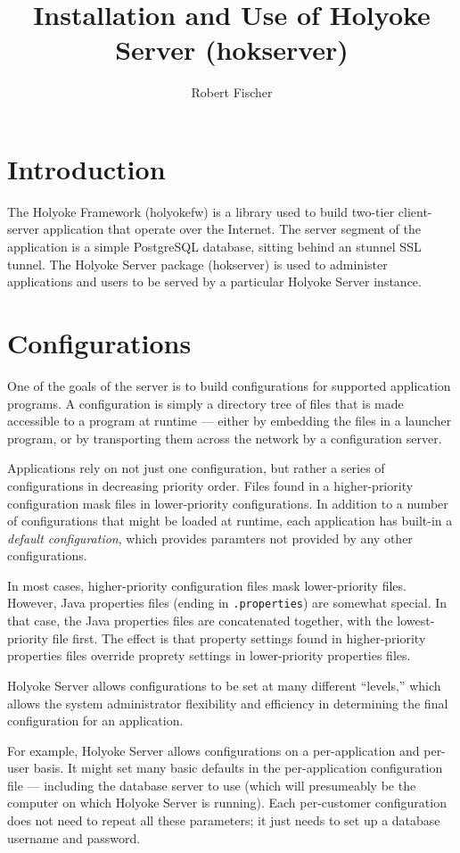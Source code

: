 \documentclass[11pt]{article}
\title{Installation and Use of Holyoke Server (hokserver)}
\author{Robert Fischer}
\begin{document}
\maketitle

\section{Introduction}

The Holyoke Framework (holyokefw) is a library used to build two-tier
client-server application that operate over the Internet.  The server
segment of the application is a simple PostgreSQL database, sitting
behind an stunnel SSL tunnel.  The Holyoke Server package (hokserver)
is used to administer applications and users to be served by a particular Holyoke Server instance.

\section{Configurations}

One of the goals of the server is to build configurations for
supported application programs.  A configuration is simply a directory
tree of files that is made accessible to a program at runtime ---
either by embedding the files in a launcher program, or by
transporting them across the network by a configuration server.

Applications rely on not just one configuration, but rather a series
of configurations in decreasing priority order.  Files found in a
higher-priority configuration mask files in lower-priority
configurations.  In addition to a number of configurations that might
be loaded at runtime, each application has built-in a \emph{default
configuration}, which provides paramters not provided by any other
configurations.

In most cases, higher-priority configuration files mask lower-priority files.  However, Java properties files (ending in {\tt .properties}) are somewhat special.  In that case, the Java properties files are concatenated together, with the lowest-priority file first.  The effect is that property settings found in higher-priority properties files override proprety settings in lower-priority properties files.

Holyoke Server allows configurations to be set at many different
``levels,'' which allows the system administrator flexibility and
efficiency in determining the final configuration for an application.

For example, Holyoke Server allows configurations on a per-application and per-user basis.  It might set many basic defaults in the per-application configuration file --- including the database server to use (which will presumeably be the computer on which Holyoke Server is running).  Each per-customer configuration does not need to repeat all these parameters; it just needs to set up a database username and password.
\end{document}
